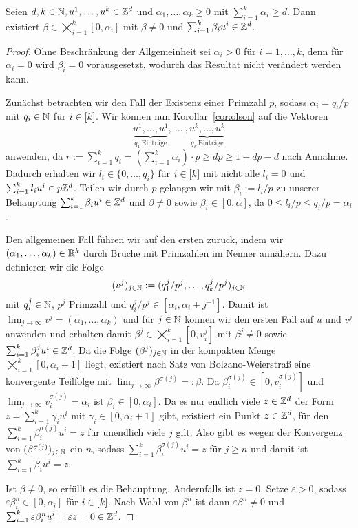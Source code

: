 \begin{lemma}
	Seien $d,k\in\mathbb{N}, u^1,\dots, u^k\in\mathbb{Z}^d$ und $\alpha_1,\dots,\alpha_k\geq0$ mit $\sum_{i=1}^k \alpha_i\geq d$.
	Dann existiert $\beta\in\bigtimes_{i=1}^k[0,\alpha_i]$ mit $\beta\neq0$ und $\sum_{i=1}^k\beta_i u^i \in\mathbb{Z}^d$.
\end{lemma}
\begin{proof}
	\newcommand{\bbeta}{\tilde{\beta}}
	Ohne Beschränkung der Allgemeinheit sei $\alpha_i>0$ für $i=1,\dots,k$, denn für $\alpha_i=0$ wird $\beta_i=0$ vorausgesetzt, wodurch das Resultat nicht verändert werden kann.
	
	Zunächst betrachten wir den Fall der Existenz einer Primzahl $p$, sodass   $\alpha_i=q_i / p$ mit $q_i\in\mathbb{N}$ für $i\in[k]$.
	Wir können nun Korollar~\ref{cor:olson} auf die Vektoren
	$$\underbrace{u^1,\dots,u^1}_{q_1~\text{Einträge}},~\dots~,\underbrace{u^k,\dots,u^k}_{q_k~\text{Einträge}}$$
	anwenden, da $r:=\sum_{i=1}^k q_i=(\sum_{i=1}^k \alpha_i)\cdot p\geq dp \geq 1+dp-d$ nach Annahme.
	Dadurch erhalten wir $l_i\in\{0,\dots,q_i\}$ für $i\in[k]$ mit nicht alle $l_i=0$ und $\sum_{i=1}^k l_i u^i\in p\mathbb{Z}^d$.
	Teilen wir durch $p$ gelangen wir mit $\beta_i := l_i/p$ zu unserer Behauptung $\sum_{i=1}^k \beta_i u^i\in\mathbb{Z}^d$ und $\beta\neq0$ sowie $\beta_i\in[0,\alpha]$, da $0\leq l_i/p\leq q_i/p=\alpha_i$.
	
	Den allgemeinen Fall führen wir auf den ersten zurück, indem wir $(\alpha_1,\dots,\alpha_k)\in\mathbb{R}^k$ durch Brüche mit Primzahlen im Nenner annähern.
	Dazu definieren wir die Folge 
	$$
	(v^j)_{j\in\mathbb{N}}:=(q^j_1/p^j,\dots,q^j_k/p^j)_{j\in\mathbb{N}}$$
	mit $q^j_i\in\mathbb{N}$, $p^j$ Primzahl und $q^j_i/p^j\in[\alpha_i, \alpha_i+j^{-1}]$.
	Damit ist $\lim_{j\rightarrow\infty}v^j=(\alpha_1,\dots,\alpha_k)$ und für $j\in\mathbb{N}$ können wir den ersten Fall auf $u$ und $v^j$ anwenden und erhalten damit $\beta^j\in\bigtimes_{i=1}^k[0,v^j_i]$ mit $\beta^j\neq0$ sowie $\sum_{i=1}^k\beta^j_i u^i \in\mathbb{Z}^d$.
	Da die Folge $(\beta^j)_{j\in\mathbb{N}}$ in der kompakten Menge $\bigtimes_{i=1}^k[0,\alpha_i+1]$ liegt, existiert nach Satz von Bolzano-Weierstraß eine konvergente Teilfolge mit $\lim_{j\to\infty} \beta^{\sigma(j)}=:\beta$.
	Da $\beta^{\sigma(j)}_i\in[0,v^{\sigma(j)}_i]$ und $\lim_{j\to\infty}v^{\sigma(j)}_i=\alpha_i$ ist $\beta_i\in[0,\alpha_i]$.
	Da es nur endlich viele $z\in\mathbb{Z}^d$ der Form $z=\sum_{i=1}^k\gamma_i u^i$ mit $\gamma_i\in[0,\alpha_i+1]$ gibt, existiert ein Punkt $z\in\mathbb{Z}^d$, für den $\sum_{i=1}^k \beta^{\sigma(j)}_i u^i=z$ für unendlich viele $j$ gilt.
	Also gibt es wegen der Konvergenz von $(\beta^{\sigma(j)})_{j\in\mathbb{N}}$ ein $n$, sodass $\sum_{i=1}^k\beta^{\sigma(j)}_i u^i=z$ für $j\geq n$ und damit ist $\sum_{i=1}^k\beta_i u^i=z$.
	
	Ist $\beta\neq0$, so erfüllt es die Behauptung.
	Andernfalls ist $z=0$.
	Setze $\varepsilon>0$, sodass $\varepsilon\beta^n_i\in[0,\alpha_i]$ für $i\in[k]$.
	Nach Wahl von $\beta^n$ ist dann $\varepsilon\beta^n\neq0$ und $\sum_{i=1}^k\varepsilon\beta^n_iu^i=\varepsilon z=0\in\mathbb{Z}^d$.
\end{proof}

